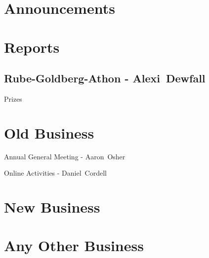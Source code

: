 \documentclass[11pt,hacksoc,agenda]{meetingmins}
\begin{document}
\maketitle

\section{Announcements}

\section{Reports}
\subsection{Rube-Goldberg-Athon - Alexi~Dewfall}
\begin{hiddensubitems}
\item {Prizes}
\end{hiddensubitems}

\section{Old Business}
\begin{items}
\item {Annual General Meeting - Aaron~Osher} 
\item {Online Activities - Daniel~Cordell}
\end{items}

\section{New Business}

\section{Any Other Business}

\vspace{1em}
\nextmeeting{}
\end{document}
